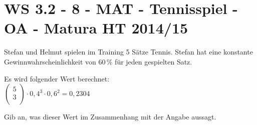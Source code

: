 \section{WS 3.2 - 8 - MAT - Tennisspiel - OA - Matura HT 2014/15}

\begin{beispiel}[WS 3.2]{1} %
Stefan und Helmut spielen im Training 5 Sätze Tennis. Stefan hat eine konstante Gewinnwahrscheinlichkeit von 60\,\% für jeden gespielten Satz. \leer

Es wird folgender Wert berechnet:\\

$\begin{pmatrix}5 \\ 3 \\\end{pmatrix} \cdot 0,4^3 \cdot 0,6^2 =0,2304$ \leer

Gib an, was dieser Wert im Zusammenhang mit der Angabe aussagt.


\end{beispiel}